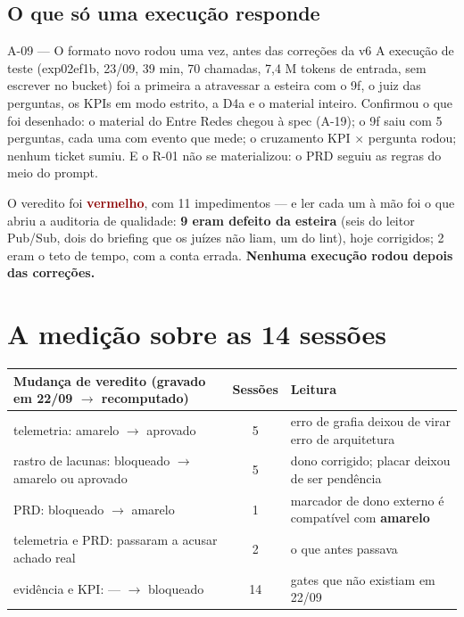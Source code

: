 \documentclass[11pt,a4paper]{article}
\newcommand{\amarelo}{\textcolor{DarkYellow}{\textbf{amarelo}}}
\newcommand{\vermelho}{\textcolor{DarkRed}{\textbf{vermelho}}}
\begin{document}
\subsection{O que só uma execução responde}

\begin{alertabox}{A-09 --- O formato novo rodou uma vez, antes das correções da v6}
A execução de teste (exp02ef1b, 23/09, 39 min, 70 chamadas, 7,4 M tokens de entrada, sem escrever no bucket) foi a primeira a atravessar a esteira com o 9f, o juiz das perguntas, os KPIs em modo estrito, a D4a e o material inteiro. Confirmou o que foi desenhado: o material do Entre Redes chegou à spec (A-19); o 9f saiu com 5 perguntas, cada uma com evento que mede; o cruzamento KPI $\times$ pergunta rodou; nenhum ticket sumiu. E o R-01 não se materializou: o PRD seguiu as regras do meio do prompt.

O veredito foi \vermelho{}, com 11 impedimentos --- e ler cada um à mão foi o que abriu a auditoria de qualidade: \textbf{9 eram defeito da esteira} (seis do leitor Pub/Sub, dois do briefing que os juízes não liam, um do lint), hoje corrigidos; 2 eram o teto de tempo, com a conta errada. \textbf{Nenhuma execução rodou depois das correções.}
\end{alertabox}

\section{A medição sobre as 14 sessões}

\begin{center}
\small
\begin{tabular}{@{}p{7.2cm}cp{6.4cm}@{}}
\toprule
\textbf{Mudança de veredito (gravado em 22/09 $\rightarrow$ recomputado)} & \textbf{Sessões} & \textbf{Leitura} \\
\midrule
telemetria: amarelo $\rightarrow$ aprovado & 5 & erro de grafia deixou de virar erro de arquitetura \\
rastro de lacunas: bloqueado $\rightarrow$ amarelo ou aprovado & 5 & dono corrigido; placar deixou de ser pendência \\
PRD: bloqueado $\rightarrow$ amarelo & 1 & marcador de dono externo é compatível com \amarelo{} \\
\midrule
telemetria e PRD: passaram a acusar achado real & 2 & o que antes passava \\
\midrule
evidência e KPI: --- $\rightarrow$ bloqueado & 14 & gates que não existiam em 22/09 \\
\bottomrule
\end{tabular}
\end{center}
\end{document}
